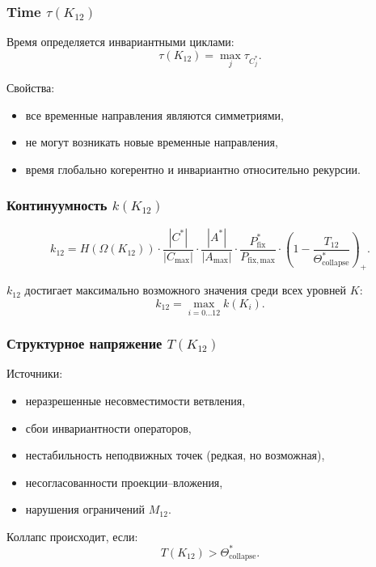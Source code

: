\subsubsection{Time $\tau(K_{12})$}

Время определяется инвариантными циклами:
\[
\tau(K_{12}) = \max_j \tau_{C_j^*}.
\]

Свойства:
\begin{itemize}
    \item все временные направления являются симметриями,
    \item не могут возникать новые временные направления,
    \item время глобально когерентно и инвариантно относительно рекурсии.
\end{itemize}

\subsubsection{Континуумность $k(K_{12})$}

\[
k_{12} =
H(\Omega(K_{12}))
\cdot
\frac{|C^*|}{|C_{\max}|}
\cdot
\frac{|A^*|}{|A_{\max}|}
\cdot
\frac{P_{\mathrm{fix}}^*}{P_{\mathrm{fix,max}}}
\cdot
\left(1-\frac{T_{12}}{\Theta^*_{\mathrm{collapse}}}\right)_+.
\]

$k_{12}$ достигает максимально возможного значения среди всех уровней $K$:
\[
k_{12} = \max_{i=0\dots12} k(K_i).
\]

\subsubsection{Структурное напряжение $T(K_{12})$}

Источники:
\begin{itemize}
    \item неразрешенные несовместимости ветвления,
    \item сбои инвариантности операторов,
    \item нестабильность неподвижных точек (редкая, но возможная),
    \item несогласованности проекции–вложения,
    \item нарушения ограничений $M_{12}$.
\end{itemize}

Коллапс происходит, если:
\[
T(K_{12}) > \Theta^*_{\mathrm{collapse}}.
\]

